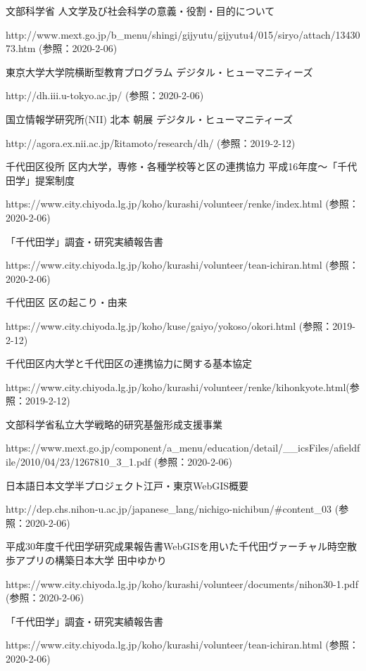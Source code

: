 \documentclass[a4paper, twoside]{jarticle}
\begin{document}
\begin{thebibliography}{99}

文部科学省 人文学及び社会科学の意義・役割・目的について\par
http://www.mext.go.jp/b\_menu/shingi/gijyutu/gijyutu4/015/siryo/attach/1343073.htm (参照：2020-2-06)

東京大学大学院横断型教育プログラム デジタル・ヒューマニティーズ\par
http://dh.iii.u-tokyo.ac.jp/ (参照：2020-2-06)

国立情報学研究所(NII) 北本 朝展 デジタル・ヒューマニティーズ\par
http://agora.ex.nii.ac.jp/\~kitamoto/research/dh/ (参照：2019-2-12)

千代田区役所 区内大学，専修・各種学校等と区の連携協力 平成16年度〜「千代田学」提案制度\par
https://www.city.chiyoda.lg.jp/koho/kurashi/volunteer/renke/index.html (参照：2020-2-06)

「千代田学」調査・研究実績報告書\par
https://www.city.chiyoda.lg.jp/koho/kurashi/volunteer/tean-ichiran.html (参照：2020-2-06)

千代田区 区の起こり・由来\par
https://www.city.chiyoda.lg.jp/koho/kuse/gaiyo/yokoso/okori.html (参照：2019-2-12)

千代田区内大学と千代田区の連携協力に関する基本協定\par
https://www.city.chiyoda.lg.jp/koho/kurashi/volunteer/renke/kihonkyote.html(参照：2019-2-12)

文部科学省私立大学戦略的研究基盤形成支援事業\par
https://www.mext.go.jp/component/a\_menu/education/detail/\_\_icsFiles/afieldfile/2010/04/23/1267810\_3\_1.pdf (参照：2020-2-06)

日本語日本文学半プロジェクト江戸・東京WebGIS概要\par
http://dep.chs.nihon-u.ac.jp/japanese\_lang/nichigo-nichibun/\#content\_03 (参照：2020-2-06)

平成30年度千代田学研究成果報告書WebGISを用いた千代田ヴァーチャル時空散歩アプリの構築日本大学 田中ゆかり\par
https://www.city.chiyoda.lg.jp/koho/kurashi/volunteer/documents/nihon30-1.pdf (参照：2020-2-06)

「千代田学」調査・研究実績報告書\par
https://www.city.chiyoda.lg.jp/koho/kurashi/volunteer/tean-ichiran.html (参照：2020-2-06)


\end{thebibliography}
\end{document}
